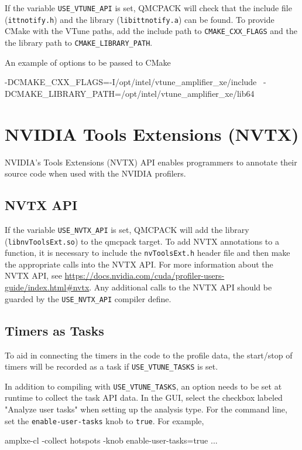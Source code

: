 If the variable \texttt{USE\_VTUNE\_API} is set, QMCPACK will check that the
include file (\texttt{ittnotify.h}) and the library (\texttt{libittnotify.a}) can
be found.
To provide CMake with the VTune paths, add the include path to \texttt{CMAKE\_CXX\_FLAGS} and the the library path to \texttt{CMAKE\_LIBRARY\_PATH}.

An example of options to be passed to CMake
\begin{shade}
 -DCMAKE_CXX_FLAGS=-I/opt/intel/vtune_amplifier_xe/include \
 -DCMAKE_LIBRARY_PATH=/opt/intel/vtune_amplifier_xe/lib64
\end{shade}

\section{NVIDIA Tools Extensions (NVTX)}

NVIDIA's Tools Extensions (NVTX) API enables programmers to annotate their source code when used with the NVIDIA profilers.

\subsection{NVTX API}

If the variable \texttt{USE\_NVTX\_API} is set, QMCPACK will add the library (\texttt{libnvToolsExt.so}) to the qmcpack target. To add NVTX annotations
to a function, it is necessary to include the \texttt{nvToolsExt.h} header file and then make the appropriate calls into the NVTX API. For more information
about the NVTX API, see \url{https://docs.nvidia.com/cuda/profiler-users-guide/index.html#nvtx}. Any additional calls to the NVTX API should be guarded by
the \texttt{USE\_NVTX\_API} compiler define.

\subsection{Timers as Tasks}
To aid in connecting the timers in the code to the profile data, the start/stop of
timers will be recorded as a task if \texttt{USE\_VTUNE\_TASKS} is set.

In addition to compiling with \texttt{USE\_VTUNE\_TASKS}, an option needs to be set at runtime to collect the task API data.
In the GUI, select the checkbox labeled "Analyze user tasks" when setting up the analysis type.
For the command line, set the \texttt{enable-user-tasks} knob to \texttt{true}. For example,
\begin{shade}
amplxe-cl -collect hotspots -knob enable-user-tasks=true ...
\end{shade}

